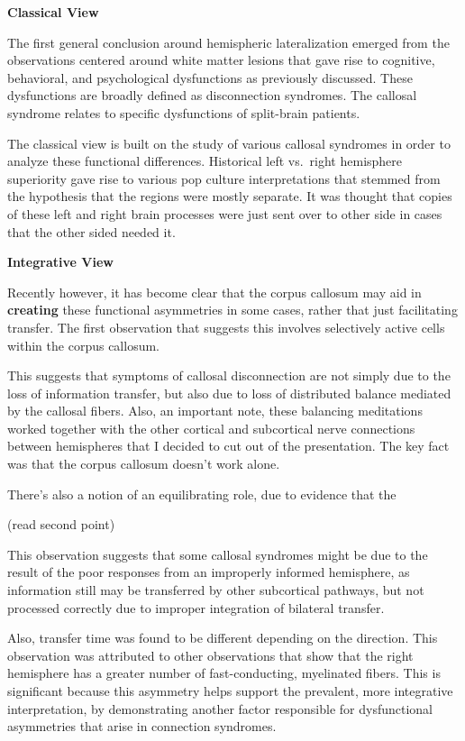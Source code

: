 \documentclass[basic]{inVerba-notes}
\begin{document}
\textbf{Classical View}

The first general conclusion around hemispheric lateralization emerged from the observations centered around white matter lesions that gave rise to cognitive, behavioral, and psychological dysfunctions as previously discussed. These dysfunctions are broadly defined as disconnection syndromes. The callosal syndrome relates to specific dysfunctions of split-brain patients. 

The classical view is built on the study of various callosal syndromes in order to analyze these functional differences. Historical left vs.\ right hemisphere superiority gave rise to various pop culture interpretations that stemmed from the hypothesis that the regions were mostly separate. It was thought that copies of these left and right brain processes were just sent over to other side in cases that the other sided needed it. 

\textbf{Integrative View}

Recently however, it has become clear that the corpus callosum may aid in \textbf{creating} these functional asymmetries in some cases, rather that just facilitating transfer. The first observation that suggests this involves selectively active cells within the corpus callosum. 

This suggests that symptoms of callosal disconnection are not simply due to the loss of information transfer, but also due to loss of distributed balance mediated by the callosal fibers. Also, an important note, these balancing meditations worked together with the other cortical and subcortical nerve connections between hemispheres that I decided to cut out of the presentation. The key fact was that the corpus callosum doesn't work alone. 

There's also a notion of an equilibrating role, due to evidence that the

(read second point)

This observation suggests that some callosal syndromes might be due to the result of the poor responses from an improperly informed hemisphere, as information still may be transferred by other subcortical pathways, but not processed correctly due to improper integration of bilateral transfer. 

Also, transfer time was found to be different depending on the direction. This observation was attributed to other observations that show that the right hemisphere has a greater number of fast-conducting, myelinated fibers. This is significant because this asymmetry helps support the prevalent, more integrative interpretation, by demonstrating another factor responsible for dysfunctional asymmetries that arise in connection syndromes. 
\end{document}
